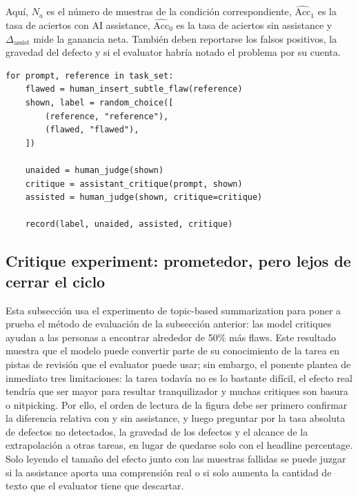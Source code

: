 Aquí, $N_a$ es el número de muestras de la condición correspondiente, $\widehat{\mathrm{Acc}}_1$ es la tasa de aciertos con AI assistance, $\widehat{\mathrm{Acc}}_0$ es la tasa de aciertos sin assistance y $\Delta_{\mathrm{assist}}$ mide la ganancia neta. También deben reportarse los falsos positivos, la gravedad del defecto y si el evaluator habría notado el problema por su cuenta.

\begin{lstlisting}[caption={Pseudocódigo mínimo de la evaluación con targeted perturbations}]
for prompt, reference in task_set:
    flawed = human_insert_subtle_flaw(reference)
    shown, label = random_choice([
        (reference, "reference"),
        (flawed, "flawed"),
    ])

    unaided = human_judge(shown)
    critique = assistant_critique(prompt, shown)
    assisted = human_judge(shown, critique=critique)

    record(label, unaided, assisted, critique)
\end{lstlisting}

\subsection{Critique experiment: prometedor, pero lejos de cerrar el ciclo}

Esta subsección usa el experimento de topic-based summarization para poner a prueba el método de evaluación de la subsección anterior: las model critiques ayudan a las personas a encontrar alrededor de 50\% más flaws. Este resultado muestra que el modelo puede convertir parte de su conocimiento de la tarea en pistas de revisión que el evaluator puede usar; sin embargo, el ponente plantea de inmediato tres limitaciones: la tarea todavía no es lo bastante difícil, el efecto real tendría que ser mayor para resultar tranquilizador y muchas critiques son basura o nitpicking. Por ello, el orden de lectura de la figura debe ser primero confirmar la diferencia relativa con y sin assistance, y luego preguntar por la tasa absoluta de defectos no detectados, la gravedad de los defectos y el alcance de la extrapolación a otras tareas, en lugar de quedarse solo con el headline percentage. Solo leyendo el tamaño del efecto junto con las muestras fallidas se puede juzgar si la assistance aporta una comprensión real o si solo aumenta la cantidad de texto que el evaluator tiene que descartar.


